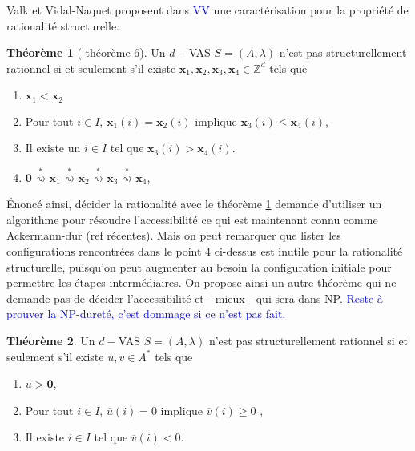 \documentclass[a4paper,final]{article}
\theoremstyle{definition}
\newtheorem{Theorem}{Théorème}
\let\leq\leqslant
\let\geq\geqslant
\newcommand{\alain}[1]{\textcolor{blue}{#1}}
\newcommand{\Z}{\ensuremath{\mathbb{Z}}}
\newcommand{\transZ}[1]{\ensuremath{\stackrel{#1}{\rightsquigarrow}}}
\newcommand{\vect}[1]{\ensuremath{\mathbf{#1}}}
\newcommand{\valeur}[1]{\ensuremath{\overline{#1}}}
\begin{document}
Valk et Vidal-Naquet proposent dans \cite{vavn81} \alain{VV} une caractérisation pour la propriété de rationalité structurelle.

\begin{Theorem}[\cite{vavn81} théorème 6]
\label{rat_struct_valk}
Un $d-$VAS $S=(A,\lambda)$ n'est pas structurellement rationnel si et seulement s'il existe $\vect{x}_1, \vect{x}_2, \vect{x}_3, \vect{x}_4 \in \Z^d$ tels que 
\begin{enumerate}
    \item $\vect{x}_1 < \vect{x}_2$
    \item Pour tout $i \in I$, $\vect{x}_1(i) = \vect{x}_2(i)$ implique $\vect{x}_3(i) \leq \vect{x}_4(i)$,
    \item Il existe un $i\in I$ tel que $\vect{x}_3(i) > \vect{x}_4(i)$.
    
    \item $\vect{0} \transZ{*} \vect{x}_1 \transZ{*} \vect{x}_2 \transZ{*} \vect{x}_3 \transZ{*} \vect{x}_4$,
\end{enumerate}
\end{Theorem}


Énoncé ainsi, décider la rationalité avec le théorème \ref{rat_struct_valk} demande d'utiliser un algorithme pour résoudre l'accessibilité ce qui est maintenant connu comme Ackermann-dur (ref récentes).
Mais on peut remarquer que lister les configurations rencontrées dans le point 4 ci-dessus est inutile pour la rationalité structurelle, puisqu'on peut augmenter au besoin la configuration initiale  pour permettre les étapes intermédiaires.
On propose ainsi un autre théorème qui ne demande pas de décider l'accessibilité et - mieux - qui sera dans NP.
\alain{Reste à prouver la NP-dureté, c'est dommage si ce n'est pas fait.}


\begin{Theorem}\label{conf_struct_rat}
\label{rat_struct_nouveau}
Un $d-$VAS $S=(A,\lambda)$ n'est pas structurellement rationnel si et seulement s'il existe $u,v\in A^*$ tels que 
\begin{enumerate}
    \item $\valeur{u} > \vect{0}$,
    \item Pour tout $i \in I$, $\valeur{u}(i)=0$ implique $\valeur{v}(i) \geq 0$ ,
    \item Il existe $i\in I$ tel que $\valeur{v}(i) < 0$.
\end{enumerate}
\end{Theorem}
\end{document}

